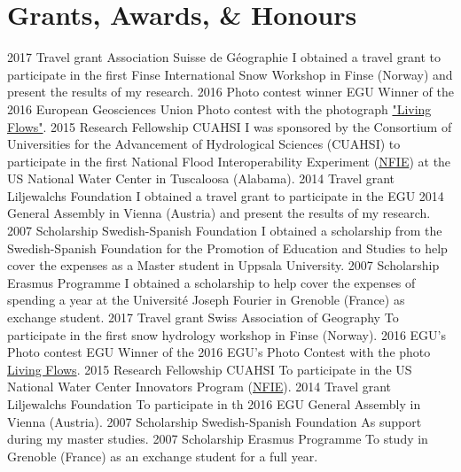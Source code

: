   \section{Grants, Awards, \& Honours}
    \ifacademic
      \position
        {2017}
        {Travel grant}
        {Association Suisse de Géographie}
        {I obtained a travel grant to participate in the first Finse International Snow Workshop in Finse (Norway) and present the results of my research.}
      \position
        {2016}
        {Photo contest winner}
        {EGU}
        {Winner of the 2016 European Geosciences Union Photo contest with the photograph \href{https://blogs.egu.eu/geolog/2016/08/29/imaggeo-on-mondays-living-flows/}{"Living Flows"}.}
      \position
        {2015}
        {Research Fellowship}
        {CUAHSI}
        {I was sponsored by the Consortium of Universities for the Advancement of Hydrological Sciences (CUAHSI) to participate in the first National Flood Interoperability Experiment (\href{https://www.cuahsi.org/education/summerinstitute/}{NFIE}) at the US National Water Center in Tuscaloosa (Alabama).}
      \position
        {2014}
        {Travel grant}
        {Liljewalchs Foundation}
        {I obtained a travel grant to participate in the EGU 2014 General Assembly in Vienna (Austria) and present the results of my research.}
      \position
        {2007}
        {Scholarship}
        {Swedish-Spanish Foundation}
        {I obtained a scholarship from the Swedish-Spanish Foundation for the Promotion of Education and Studies to help cover the expenses as a Master student in Uppsala University.}
      \position
        {2007}
        {Scholarship}
        {Erasmus Programme}
        {I obtained a scholarship to help cover the expenses of spending a year at the Université Joseph Fourier in Grenoble (France) as exchange student.}
    \else
      \position
        {2017}
        {Travel grant}
        {Swiss Association of Geography}
        {To participate in the first snow hydrology workshop in Finse (Norway).}
      \position
        {2016}
        {EGU's Photo contest}
        {EGU}
        {Winner of the 2016 EGU's Photo Contest with the photo \href{https://blogs.egu.eu/geolog/2016/08/29/imaggeo-on-mondays-living-flows/}{Living Flows}.}
      \position
        {2015}
        {Research Fellowship}
        {CUAHSI}
        {To participate in the US National Water Center Innovators Program (\href{https://www.cuahsi.org/education/summerinstitute/}{NFIE}).}
      \position
        {2014}
        {Travel grant}
        {Liljewalchs Foundation}
        {To participate in th 2016 EGU General Assembly in Vienna (Austria).}
      \position
        {2007}
        {Scholarship}
        {Swedish-Spanish Foundation}
        {As support during my master studies.}
      \position
        {2007}
        {Scholarship}
        {Erasmus Programme}
        {To study in Grenoble (France) as an exchange student for a full year.}
    \fi
\fi
